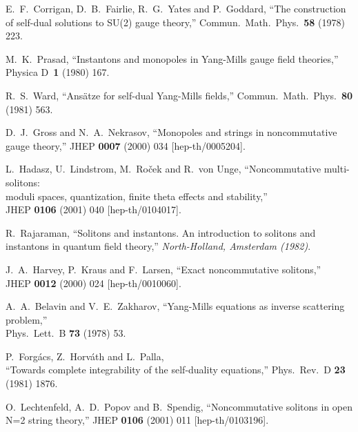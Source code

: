 \documentclass[a4paper,11pt]{article}
\numberwithin{equation}{section}
\begin{document}
{\begin{thebibliography}{99}
E.~F.~Corrigan, D.~B.~Fairlie, R.~G.~Yates and P.~Goddard,
``The construction of self-dual solutions to SU(2) gauge theory,''
Commun.\ Math.\ Phys.\  {\bf 58} (1978) 223.

M.~K.~Prasad,
``Instantons and monopoles in Yang-Mills gauge field theories,''\\
Physica D~{\bf 1} (1980) 167.

R.~S.~Ward,
``Ans\"atze for self-dual Yang-Mills fields,''
Commun.\ Math.\ Phys.\  {\bf 80} (1981) 563.

D.~J.~Gross and N.~A.~Nekrasov,
``Monopoles and strings in noncommutative gauge theory,''
JHEP {\bf 0007} (2000) 034
[hep-th/0005204].

L.~Hadasz, U.~Lindstrom, M.~Ro\v cek and R.~von Unge,
``Noncommutative multi-solitons: \\ moduli spaces, quantization, 
  finite theta effects and stability,''\\
JHEP {\bf 0106} (2001) 040
[hep-th/0104017].

R.~Rajaraman,
``Solitons and instantons. 
  An introduction to solitons and instantons in quantum field theory,''
{\it North-Holland, Amsterdam (1982)}.

J.~A.~Harvey, P.~Kraus and F.~Larsen,
``Exact noncommutative solitons,''\\
JHEP {\bf 0012} (2000) 024
[hep-th/0010060].

A.~A.~Belavin and V.~E.~Zakharov,
``Yang-Mills equations as inverse scattering problem,''\\
Phys.\ Lett.\ B {\bf 73} (1978) 53.

P.~Forg\'acs, Z.~Horv\'ath and L.~Palla,\\
``Towards complete integrability of the self-duality equations,''
Phys.\ Rev.\ D {\bf 23} (1981) 1876.

O.~Lechtenfeld, A.~D.~Popov and B.~Spendig,
``Noncommutative solitons in open N=2 string theory,''
JHEP {\bf 0106} (2001) 011
[hep-th/0103196].


\end{thebibliography}}
\end{document}
